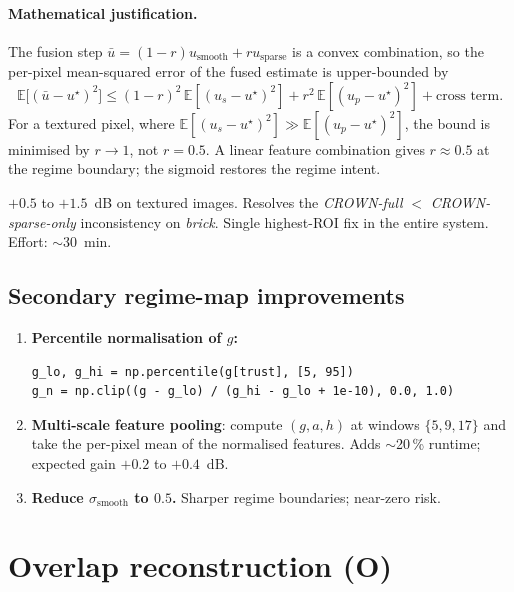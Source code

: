\documentclass[11pt,a4paper]{article}
\begin{document}
\paragraph{Mathematical justification.} The fusion step
$\bar u = (1-r) u_{\mathrm{smooth}} + r u_{\mathrm{sparse}}$ is a convex
combination, so the per-pixel mean-squared error of the fused estimate is
upper-bounded by
\begin{equation}
    \mathbb{E}\bigl[(\bar u - u^\star)^2\bigr]
    \le (1-r)^2\,\mathbb{E}[(u_s - u^\star)^2]
       + r^2\,\mathbb{E}[(u_p - u^\star)^2] + \text{cross term}.
\end{equation}
For a textured pixel, where $\mathbb{E}[(u_s - u^\star)^2] \gg
\mathbb{E}[(u_p - u^\star)^2]$, the bound is minimised by $r\to 1$, not
$r=0.5$. A linear feature combination gives $r\approx 0.5$ at the regime
boundary; the sigmoid restores the regime intent.

\begin{impactbox}
$+0.5$ to $+1.5$~dB on textured images. Resolves the
\emph{CROWN-full} $<$ \emph{CROWN-sparse-only} inconsistency on
\emph{brick}. Single highest-ROI fix in the entire system. Effort:
$\sim$30~min.
\end{impactbox}

\subsection*{Secondary regime-map improvements}

\begin{enumerate}[leftmargin=2em]
    \item \textbf{Percentile normalisation of $g$:}
    \begin{lstlisting}
g_lo, g_hi = np.percentile(g[trust], [5, 95])
g_n = np.clip((g - g_lo) / (g_hi - g_lo + 1e-10), 0.0, 1.0)
    \end{lstlisting}
    \item \textbf{Multi-scale feature pooling}: compute $(g, a, h)$ at
    windows $\{5, 9, 17\}$ and take the per-pixel mean of the normalised
    features. Adds $\sim$20\,\% runtime; expected gain
    $+0.2$ to $+0.4$~dB.
    \item \textbf{Reduce $\sigma_{\mathrm{smooth}}$ to $0.5$.} Sharper
    regime boundaries; near-zero risk.
\end{enumerate}

\section{Overlap reconstruction (O)}\label{sec:O}
\end{document}
